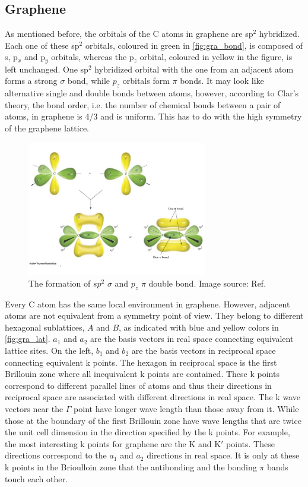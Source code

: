 \subsection{Graphene}

As mentioned before, the orbitals of the C atoms in graphene are sp$^2$ hybridized. Each one of these sp$^2$ orbitals, coloured in green in \autoref{fig:gra_bond}, is composed of s, p$_x$ and p$_y$ orbitals, whereas the p$_z$ orbital, coloured in yellow in the figure, is left unchanged. One sp$^2$ hybridized orbital with the one from an adjacent atom forms a strong $\sigma$ bond, while $p_z$ orbitals form $\pi$ bonds. It may look like alternative single and double bonds between atoms, however, according to Clar's theory, the bond order, i.e. the number of chemical bonds between a pair of atoms, in graphene is 4/3 and is uniform\cite{Wassmann2010}. This has to do with the high symmetry of the graphene lattice.

\begin{figure}[htbp!] 
\centering  
\includegraphics[width=0.7\textwidth]{double_bond}
\caption{The formation of $sp^2$ $\sigma$ and $p_z$ $\pi$ double bond. Image source: Ref. \cite{gra_bond} }  
\label{fig:gra_bond}
\end{figure} 

Every C atom has the same local environment in graphene. However, adjacent atoms are not equivalent from a symmetry point of view. They belong to different hexagonal sublattices, $A$ and $B$, as indicated with blue and yellow colors in \autoref{fig:gra_lat}. $a_1$ and $a_2$ are the basis vectors in real space connecting equivalent lattice sites. On the left, $b_1$ and $b_2$ are the basis vectors in reciprocal space connecting equivalent k points. The hexagon in reciprocal space is the first Brillouin zone where all inequivalent k points are contained. These k points correspond to different parallel lines of atoms and thus their directions in reciprocal space are associated with different directions in real space. The k wave vectors near the $\Gamma$ point have longer wave length than those away from it. While those at the boundary of the first Brillouin zone have wave lengths that are twice the unit cell dimension in the direction specified by the k points. For example, the most interesting k points for graphene are the $\mathrm{K}$ and $\mathrm{K}'$ points. These directions correspond to the $a_1$ and $a_2$ directions in real space. It is only at these k points in the Brioulloin zone that the antibonding and the bonding $\pi$ bands touch each other.  

